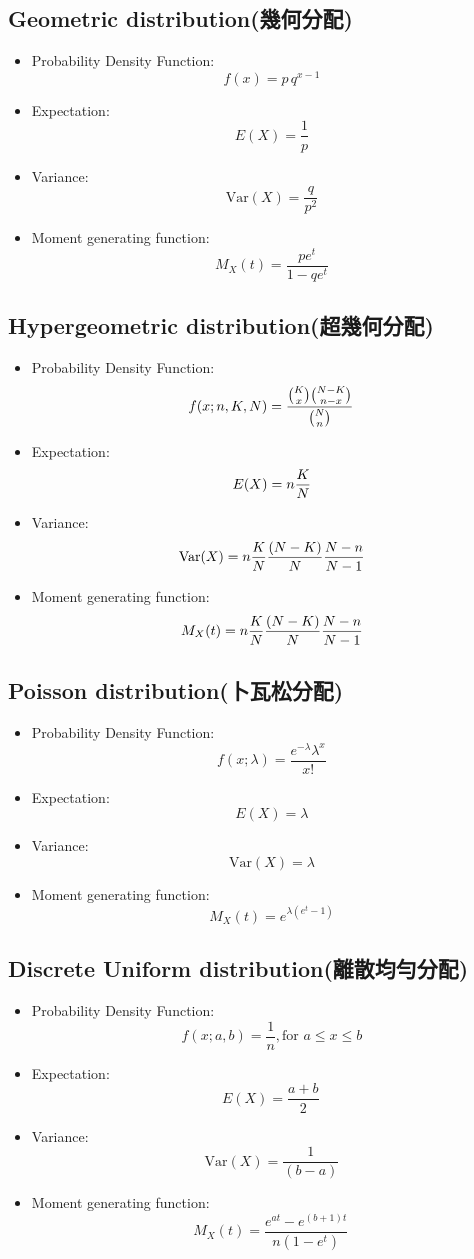 \documentclass[12pt, a4paper]{article}
\begin{document}
\subsection{Geometric distribution(幾何分配)}
\begin{itemize}
\item Probability Density Function:$$f(x)=p\,q^{{x-1}}$$
\item Expectation:$$E(X) = \frac{1}{p}$$
\item Variance:$$\text{Var}(X) = \frac{q}{p^2}$$
\item Moment generating function:$$M_X(t) = {\frac  {pe^{t}}{1-qe^{t}}}\!$$
\end{itemize}
\subsection{Hypergeometric distribution(超幾何分配)}
\begin{itemize}
\item Probability Density Function:$${\displaystyle f(x;n,K,N)={{{K \choose x}{{N-K} \choose {n-x}}} \over {N \choose n}}}$$
\item Expectation:$$E(X) = {\displaystyle n{K \over N}}$$
\item Variance:$$\text{Var}(X) = {\displaystyle n{K \over N}{(N-K) \over N}{N-n \over N-1}}$$
\item Moment generating function:$$M_X(t) = {\displaystyle n{K \over N}{(N-K) \over N}{N-n \over N-1}}$$
\end{itemize}
\subsection{Poisson distribution(卜瓦松分配)}
\begin{itemize}
\item Probability Density Function:$$f(x;\lambda)=\frac{e^{-\lambda}\lambda^x}{x!}$$
\item Expectation:$$E(X) = \lambda$$
\item Variance:$$\text{Var}(X) = \lambda$$
\item Moment generating function:$$M_X(t) = e^{\lambda (e^{{t}}-1)}$$
\end{itemize}
\subsection{Discrete Uniform distribution(離散均勻分配)}
\begin{itemize}
\item Probability Density Function:$$f(x;a,b)=\frac{1}{n} ,\mbox{for }a\le x \le b$$
\item Expectation:$$E(X) = \frac{a+b}{2}\,$$
\item Variance:$$\text{Var}(X) = \frac{1}{(b-a)}$$
\item Moment generating function:$$M_X(t) = \frac{e^{at}-e^{(b+1)t}}{n(1-e^t)}\,$$
\end{itemize}
\end{document}

